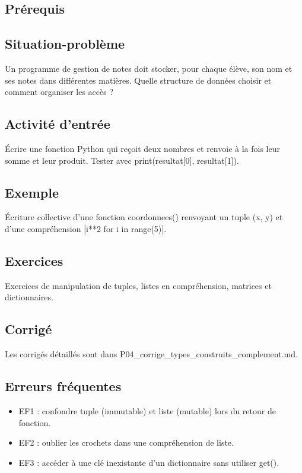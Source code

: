 \subsection{Prérequis}

\subsection{Situation-problème}

Un programme de gestion de notes doit stocker, pour chaque élève, son
nom et ses notes dans différentes matières. Quelle structure de données
choisir et comment organiser les accès ?

\subsection{Activité d’entrée}

Écrire une fonction Python qui reçoit deux nombres et renvoie à la fois
leur somme et leur produit. Tester avec print(resultat{[}0{]},
resultat{[}1{]}).

\subsection{Exemple}

Écriture collective d'une fonction coordonnees() renvoyant un tuple (x,
y) et d'une compréhension {[}i**2 for i in range(5){]}.

\subsection{Exercices}

Exercices de manipulation de tuples, listes en compréhension, matrices
et dictionnaires.

\subsection{Corrigé}

Les corrigés détaillés sont dans
P04\_corrige\_types\_construits\_complement.md.

\subsection{Erreurs fréquentes}

\begin{itemize}
\tightlist
\item
  EF1 : confondre tuple (immutable) et liste (mutable) lors du retour de
  fonction.
\item
  EF2 : oublier les crochets dans une compréhension de liste.
\item
  EF3 : accéder à une clé inexistante d'un dictionnaire sans utiliser
  get().
\end{itemize}

